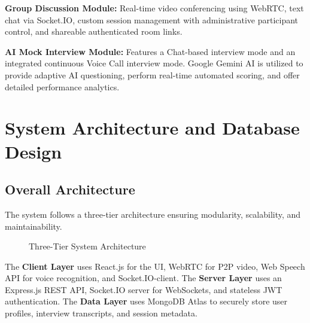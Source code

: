 \documentclass[conference]{IEEEtran}
\begin{document}
\textbf{Group Discussion Module:} Real-time video conferencing using WebRTC, text chat via Socket.IO, custom session management with administrative participant control, and shareable authenticated room links.

\textbf{AI Mock Interview Module:} Features a Chat-based interview mode and an integrated continuous Voice Call interview mode. Google Gemini AI is utilized to provide adaptive AI questioning, perform real-time automated scoring, and offer detailed performance analytics.

\section{System Architecture and Database Design}

\subsection{Overall Architecture}
The system follows a three-tier architecture ensuring modularity, scalability, and maintainability.

\begin{figure}[htbp]
\centering
{}
\caption{Three-Tier System Architecture}
\label{fig:arch}
\end{figure}

The \textbf{Client Layer} uses React.js for the UI, WebRTC for P2P video, Web Speech API for voice recognition, and Socket.IO-client.
The \textbf{Server Layer} uses an Express.js REST API, Socket.IO server for WebSockets, and stateless JWT authentication.
The \textbf{Data Layer} uses MongoDB Atlas to securely store user profiles, interview transcripts, and session metadata.
\end{document}
